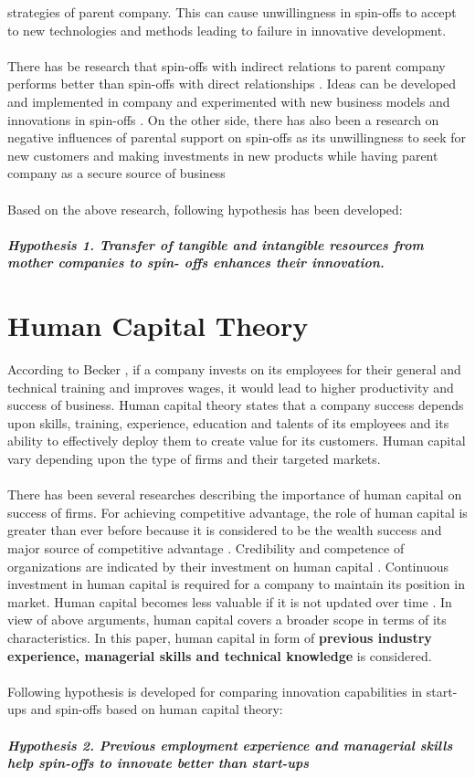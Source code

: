 strategies of parent company. This can cause unwillingness in spin-offs to accept to new
technologies and methods leading to failure in innovative development.
\\
\\
There has be research that spin-offs with indirect relations to parent company performs better
than spin-offs with direct relationships  \cite{35} . Ideas can be developed and implemented in company and
experimented with new business models and innovations in spin-offs \cite{36}. On the other side, there
has also been a research on negative influences of parental support on spin-offs as its unwillingness
to seek for new customers and making investments in new products while having parent company
as a secure source of business \cite{37}
\\
\\
Based on the above research, following hypothesis has been developed:
\\
\\
\textbf{\textit{Hypothesis 1. Transfer of tangible and intangible resources from mother companies to spin-
offs enhances their innovation.}}

\section{Human Capital Theory\label{sec:human-based-theory}}
According to Becker \cite{59}, if a company invests on its employees for their general and technical training and improves wages,
it would lead to higher productivity and success of business. Human capital theory states that a company success depends upon skills, training,
experience, education and talents of its employees and its ability to effectively deploy them to
create value for its customers. Human capital vary depending upon the type of firms and their
targeted markets.
\\
\\
There has been several researches describing the importance of human capital on
success of firms. For achieving competitive advantage, the role of human capital is greater than
ever before because it is considered to be the wealth success and major source of competitive
advantage \cite{38}. Credibility and competence of organizations are indicated by their investment on
human capital \cite{39}. Continuous investment in human capital is required for a company to maintain
its position in market. Human capital becomes less valuable if it is not updated over time \cite{40}. In
view of above arguments, human capital covers a broader scope in terms of its characteristics. In this
paper, human capital in form of \textbf{previous industry experience, managerial skills and technical
knowledge} is considered. 
\\
\\
Following hypothesis is developed for comparing innovation capabilities in start-ups
and spin-offs based on human capital theory:
\\
\\
\textbf{\textit{Hypothesis 2. Previous employment experience and managerial skills help spin-offs to
innovate better than start-ups}}

